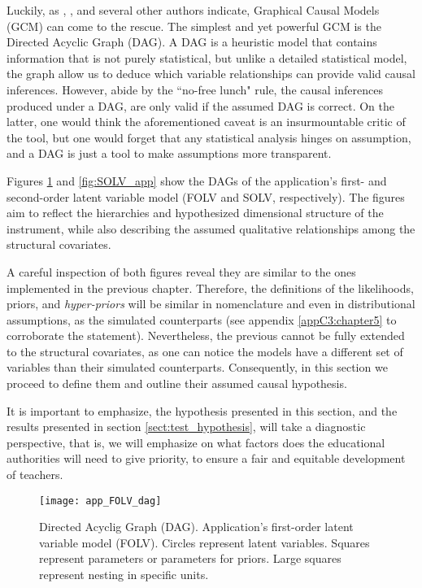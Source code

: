 Luckily, as \citet{McElreath_2020}, \citet{Hernan_et_al_2020}, and several other authors indicate, Graphical Causal Models (GCM) can come to the rescue. The simplest and yet powerful GCM is the Directed Acyclic Graph (DAG). A DAG is a heuristic model that contains information that is not purely statistical, but unlike a detailed statistical model, the graph allow us to deduce which variable relationships can provide valid causal inferences. However, abide by the ``no-free lunch" rule, the causal inferences produced under a DAG, are only valid if the assumed DAG is correct. On the latter, one would think the aforementioned caveat is an insurmountable critic of the tool, but one would forget that any statistical analysis hinges on assumption, and a DAG is just a tool to make assumptions more transparent.

Figures \ref{fig:FOLV_app} and \ref{fig:SOLV_app} show the DAGs of the application's first- and second-order latent variable model (FOLV and SOLV, respectively). The figures aim to reflect the hierarchies and hypothesized dimensional structure of the instrument, while also describing the assumed qualitative relationships among the structural covariates. 

A careful inspection of both figures reveal they are similar to the ones implemented in the previous chapter. Therefore, the definitions of the likelihoods, priors, and \textit{hyper-priors} will be similar in nomenclature and even in distributional assumptions, as the simulated counterparts (see appendix \ref{appC3:chapter5} to corroborate the statement). Nevertheless, the previous cannot be fully extended to the structural covariates, as one can notice the models have a different set of variables than their simulated counterparts. Consequently, in this section we proceed to define them and outline their assumed causal hypothesis.

It is important to emphasize, the hypothesis presented in this section, and the results presented in section \ref{sect:test_hypothesis}, will take a diagnostic perspective, that is, we will emphasize on what factors does the educational authorities will need to give priority, to ensure a fair and equitable development of teachers.
%
\begin{figure}[H]
	\centering
	\texttt{[image: app\_FOLV\_dag]}
	\caption[Directed Acyclic Graph (DAG). Application's first-order latent variable model (FOLV).]%
	{Directed Acyclig Graph (DAG). Application's first-order latent variable model (FOLV). Circles represent latent variables. Squares represent parameters or parameters for priors. Large squares represent nesting in specific units.}
	\label{fig:FOLV_app}
\end{figure}

